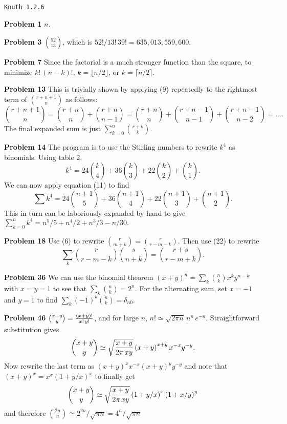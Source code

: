 \vskip 0.5in
\centerline{\tt Knuth 1.2.6}
\vskip 0.3in

\noindent
{\bf Problem 1} $n$.

\vskip 0.1in
\noindent
{\bf Problem 3} $52 \choose 13$, which is ${52! / 13! \, 39!} = 635,013,559,600.$

\vskip 0.1in
\noindent
{\bf Problem 7} Since the factorial is a much stronger function than the square,
 to minimize $k! \, \left(n-k\right)!$, $k = \lfloor n/2 \rfloor$, or
 $k = \lceil n/2 \rceil$.

\vskip 0.1in
\noindent
{\bf Problem 13} This is trivially shown by applying (9) repeatedly to the rightmost
 term of $r + n + 1 \choose n$ as follows:
 $$
   {r + n + 1 \choose n} = {r + n \choose n} + {r + n \choose n - 1} =
      {r + n \choose n} + {r + n - 1 \choose n - 1} + {r + n - 1 \choose n - 2} = \ldots.
 $$
 The final expanded sum is just $\sum_{k=0}^n {r+k \choose k}$.
    
\vskip 0.1in
\noindent
{\bf Problem 14} The program is to use the Stirling numbers to rewrite $k^4$ as binomials.
   Using table 2,
   $$k^4 = 24 {k \choose 4} + 36 {k \choose 3} + 22 {k \choose 2} + {k \choose 1}.$$
   We can now apply equation (11) to find $$\sum k^4 = 24 {n + 1 \choose 5} +
     36 { n + 1 \choose 4 } + 22 { n + 1 \choose 3 } + { n+1 \choose 2}.$$
   This in turn can be laboriously expanded by hand to give
   $\sum_{k=0}^n k^4 = n^5/5 + n^4/2 + n^3/3 - n/30.$
   
\vskip 0.1in
\noindent
{\bf Problem 18} Use (6) to rewrite ${r \choose m + k} = {r \choose r - m - k}$.  Then use
 (22) to rewrite
 $$ \sum_k {r \choose r - m - k} {s \choose n + k} = {r + s \choose r - m + k}. $$
   
\vskip 0.1in
\noindent
{\bf Problem 36} We can use the binomial theorem $\left(x+y\right)^n = \sum_{k} {n \choose k} x^k y^{n-k}$
 with $x = y = 1$ to see that $\sum_k {n \choose k} = 2^n$.  For the alternating sum, set $x=-1$ and $y=1$
 to find $\sum_k \left(-1\right)^{k} {n \choose k} = \delta_{n0}$.
 
\vskip 0.1in
\noindent
{\bf Problem 46} ${x + y \choose y} = {\left(x + y\right)! \over x! \, y!}$, and for large $n$, 
 $n! \simeq \sqrt{2 \pi n}\, n^n\, e^{-n}$.  Straightforward substitution gives 
 $${ x + y \choose y } \simeq \sqrt{ x + y \over 2 \pi \, x y } \left(x+y\right)^{x+y} x^{-x} y^{-y}.$$
 Now rewrite the last term as $\left(x+y\right)^{x} x^{-x} \left(x+y\right)^y y^{-y}$ and note that
 $\left(x+y\right)^x = x^x \left(1 + y/x\right)^x$ to finally get
 $$
   { x + y \choose y } \simeq \sqrt{ x + y \over 2 \pi \, x y } \left(1+y/x\right)^x \left(1+x/y\right)^y 
 $$
 and therefore ${2 n \choose n} \simeq 2^{2n} / \sqrt{\pi n} = 4^n / \sqrt{\pi n}$
   

